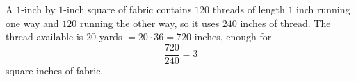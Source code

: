 A $1$-inch by $1$-inch square of fabric contains $120$ threads of length $1$ inch running one way and $120$ running the other way, so it uses $240$ inches of thread. The thread available is $20$ yards $=20\cdot36=720$ inches, enough for
\[
\dfrac{720}{240}=\boxed{3}
\]
square inches of fabric.
